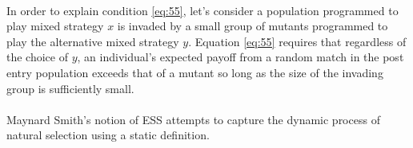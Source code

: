 \paragraph{}In order to explain condition \ref{eq:55}, let's consider a population programmed to play mixed strategy $x$ is invaded by a small group of mutants programmed to play the alternative mixed strategy $y$. Equation \ref{eq:55} requires that regardless of the choice of $y$, an individual's expected payoff from a random match in the post entry population exceeds that of a mutant so long as the size of the invading group is sufficiently small.
\paragraph{}Maynard Smith's notion of ESS attempts to capture the dynamic process of natural selection using a static definition.


